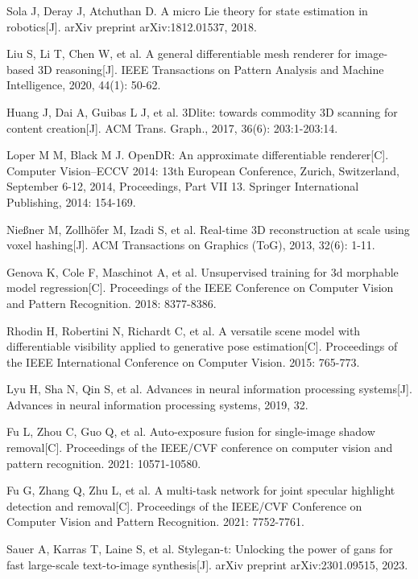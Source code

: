 Sola J, Deray J, Atchuthan D. A micro Lie theory for state estimation in robotics[J]. arXiv preprint arXiv:1812.01537, 2018.


Liu S, Li T, Chen W, et al. A general differentiable mesh renderer for image-based 3D reasoning[J]. IEEE Transactions on Pattern Analysis and Machine Intelligence, 2020, 44(1): 50-62.

Huang J, Dai A, Guibas L J, et al. 3Dlite: towards commodity 3D scanning for content creation[J]. ACM Trans. Graph., 2017, 36(6): 203:1-203:14.

Loper M M, Black M J. OpenDR: An approximate differentiable renderer[C]. Computer Vision–ECCV 2014: 13th European Conference, Zurich, Switzerland, September 6-12, 2014, Proceedings, Part VII 13. Springer International Publishing, 2014: 154-169.

Nießner M, Zollhöfer M, Izadi S, et al. Real-time 3D reconstruction at scale using voxel hashing[J]. ACM Transactions on Graphics (ToG), 2013, 32(6): 1-11.

Genova K, Cole F, Maschinot A, et al. Unsupervised training for 3d morphable model regression[C]. Proceedings of the IEEE Conference on Computer Vision and Pattern Recognition. 2018: 8377-8386.

Rhodin H, Robertini N, Richardt C, et al. A versatile scene model with differentiable visibility applied to generative pose estimation[C]. Proceedings of the IEEE International Conference on Computer Vision. 2015: 765-773.

Lyu H, Sha N, Qin S, et al. Advances in neural information processing systems[J]. Advances in neural information processing systems, 2019, 32.

Fu L, Zhou C, Guo Q, et al. Auto-exposure fusion for single-image shadow removal[C]. Proceedings of the IEEE/CVF conference on computer vision and pattern recognition. 2021: 10571-10580.

Fu G, Zhang Q, Zhu L, et al. A multi-task network for joint specular highlight detection and removal[C]. Proceedings of the IEEE/CVF Conference on Computer Vision and Pattern Recognition. 2021: 7752-7761.

Sauer A, Karras T, Laine S, et al. Stylegan-t: Unlocking the power of gans for fast large-scale text-to-image synthesis[J]. arXiv preprint arXiv:2301.09515, 2023.

